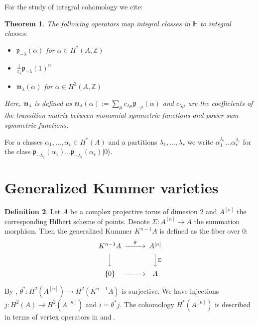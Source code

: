 \documentclass{amsart}
\newcommand{\hilb}[1]{^{[#1]}}
\newcommand{\vac}{|0\rangle}
\newcommand{\p}{\mathfrak{p}}
\renewcommand{\H}{\mathbb{H}}
\newcommand{\Z}{\mathbb{Z}}
\theoremstyle{plain}
\newtheorem{theorem}{Theorem}[section]
\theoremstyle{definition}
\newtheorem{definition}[theorem]{Definition}
\theoremstyle{remark}
\begin{document}
For the study of integral cohomology we cite:
\begin{theorem} \cite{QinWang}
The following operators map integral classes in $\H$ to integral classes:
\begin{itemize}
\item $\p_{-\lambda}(\alpha)$ for $\alpha \in H^*(A,\Z)$ 
\item $\frac{1}{z_\lambda}\p_{-\lambda}(1)^n$ 
\item $\mathfrak{m}_{\lambda}(\alpha)$ for $\alpha \in H^2(A,\Z)$ 
\end{itemize}
Here, $\mathfrak{m}_{\lambda}$ is defined as $\mathfrak{m}_{\lambda}(\alpha):=\sum_{\mu} c_{\lambda\mu} \p_{-\mu}(\alpha) $ and $c_{\lambda\mu}$ are the coefficients of the transition matrix between monomial symmetric functions and power sum symmetric functions.
\end{theorem}
For a classes $\alpha_1,\ldots ,\alpha_r \in H^*(A)$ and a partitions $\lambda_1,\ldots, \lambda_r$ we write $\alpha_1^{\lambda_1}\ldots\alpha_r^{\lambda_r}$ for the class $\p_{-\lambda_1}(\alpha_1)\ldots\p_{-\lambda_r}(\alpha_r)\vac$.
\section{Generalized Kummer varieties}
\begin{definition}
Let $A$ be a complex projective torus of dimesion $2$ and $A\hilb{n}$ the corresponding Hilbert scheme of points. Denote $\Sigma : A\hilb{n} \rightarrow A$ the summation morphism. Then the generalized Kummer $K^{n-1} A $ is defined as the fiber over $0$:
\begin{equation*}
\begin{CD}
K^{n-1}A @>\theta >> A\hilb{n}\\
@VVV @VV\Sigma V\\
\{0\} @> >> A
\end{CD}
\end{equation*}
\end{definition}
By \cite{Beauville}, $\theta^{\ast} : H^2(A\hilb{n}) \rightarrow H^2(K^{n-1}A)$ is surjective. We have injections $j : H^2(A)\rightarrow H^2(A\hilb{n})$ and $i = \theta^* j$. The cohomology $H^*(A\hilb{n})$ is described in terms of vertex operators in \cite{LehnSorger} and \cite{LiQinWang}.
\end{document}
